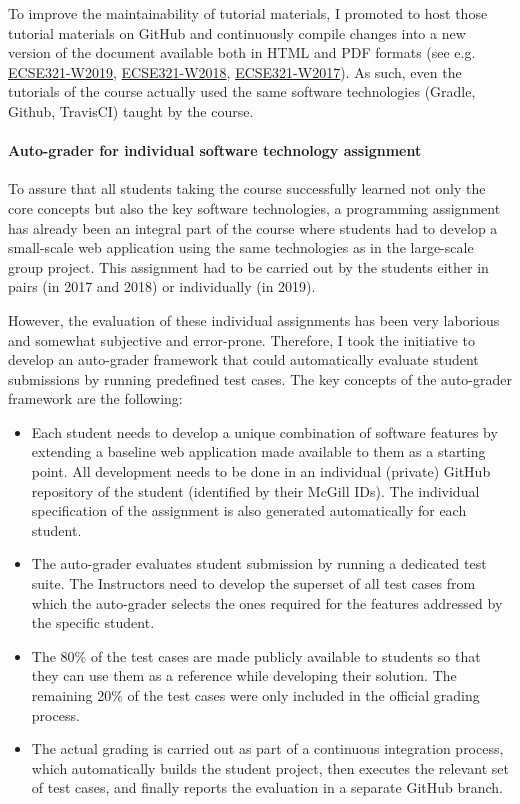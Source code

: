 To improve the maintainability of tutorial materials, I promoted to host those tutorial materials on GitHub and continuously compile changes into a new version of the document available both in HTML and PDF formats (see e.g. 
\href{https://mcgill-ecse321-winter2019.github.io/EventRegistration-Tutorials/}{ECSE321-W2019}, 
\href{https://mcgill-ecse321-winter2018.github.io/EventRegistration-Tutorials/}{ECSE321-W2018}, 
\href{https://ecse321-winter2017-mcgill.github.io/EventRegistration-Tutorials/}{ECSE321-W2017}). As such, even the tutorials of the course actually used the same software technologies (Gradle, Github, TravisCI) taught by the course. 



\paragraph{Auto-grader for individual software technology assignment}
To assure that all students taking the course successfully learned not only the core concepts but also the key software technologies, a programming assignment has already been an integral part of the course where students had to develop a small-scale web application using the same technologies as in the large-scale group project. This assignment had to be carried out by the students either in pairs (in 2017 and 2018) or individually (in 2019). 

However, the evaluation of these individual assignments has been very laborious and somewhat subjective and error-prone. Therefore, I took the initiative to develop an auto-grader framework that could automatically evaluate student submissions by running predefined test cases. The key concepts of the auto-grader framework are the following:

\begin{itemize}[leftmargin=0.5cm]
\item Each student needs to develop a unique combination of software features by extending a baseline web application made available to them as a starting point. All development needs to be done in an individual (private) GitHub repository of the student (identified by their McGill IDs). The individual specification of the assignment is also generated automatically for each student. 
\item The auto-grader evaluates student submission by running a dedicated test suite. The Instructors need to develop the superset of all test cases from which the auto-grader selects the ones required for the features addressed by the specific student. 
\item The 80\% of the test cases are made publicly available to students so that they can use them as a reference while developing their solution. The remaining 20\% of the test cases were only included in the official grading process. 
\item The actual grading is carried out as part of a continuous integration process, which automatically builds the student project, then executes the relevant set of test cases, and finally reports the evaluation in a separate GitHub branch.
\end{itemize}

